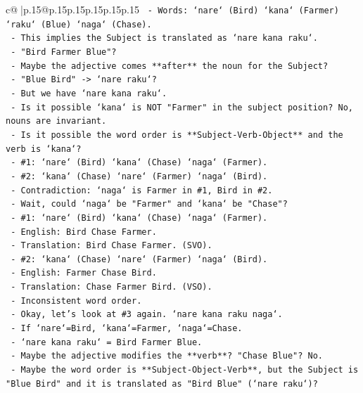 \documentclass{article}
\begin{document}
{\begin{supertabular}{c@{$\;$}|p{.15\linewidth}@{}p{.15\linewidth}p{.15\linewidth}p{.15\linewidth}p{.15\linewidth}p{.15\linewidth}}
{{{\texttt{        {-} Words: `nare` (Bird) `kana` (Farmer) `raku` (Blue) `naga` (Chase).} \\
\texttt{        {-} This implies the Subject is translated as `nare kana raku`.} \\
\texttt{        {-} "Bird Farmer Blue"?} \\
\texttt{        {-} Maybe the adjective comes **after** the noun for the Subject?} \\
\texttt{          {-} "Blue Bird" {-}> `nare raku`?} \\
\texttt{          {-} But we have `nare kana raku`.} \\
\texttt{          {-} Is it possible `kana` is NOT "Farmer" in the subject position? No, nouns are invariant.} \\
\texttt{          {-} Is it possible the word order is **Subject{-}Verb{-}Object** and the verb is `kana`?} \\
\texttt{            {-} \#1: `nare` (Bird) `kana` (Chase) `naga` (Farmer).} \\
\texttt{            {-} \#2: `kana` (Chase) `nare` (Farmer) `naga` (Bird).} \\
\texttt{              {-} Contradiction: `naga` is Farmer in \#1, Bird in \#2.} \\
\texttt{    {-} Wait, could `naga` be "Farmer" and `kana` be "Chase"?} \\
\texttt{      {-} \#1: `nare` (Bird) `kana` (Chase) `naga` (Farmer).} \\
\texttt{        {-} English: Bird Chase Farmer.} \\
\texttt{        {-} Translation: Bird Chase Farmer. (SVO).} \\
\texttt{      {-} \#2: `kana` (Chase) `nare` (Farmer) `naga` (Bird).} \\
\texttt{        {-} English: Farmer Chase Bird.} \\
\texttt{        {-} Translation: Chase Farmer Bird. (VSO).} \\
\texttt{        {-} Inconsistent word order.} \\
\texttt{    {-} Okay, let's look at \#3 again. `nare kana raku naga`.} \\
\texttt{      {-} If `nare`=Bird, `kana`=Farmer, `naga`=Chase.} \\
\texttt{      {-} `nare kana raku` = Bird Farmer Blue.} \\
\texttt{      {-} Maybe the adjective modifies the **verb**? "Chase Blue"? No.} \\
\texttt{      {-} Maybe the word order is **Subject{-}Object{-}Verb**, but the Subject is "Blue Bird" and it is translated as "Bird Blue" (`nare raku`)?} \\
}}}
\end{supertabular}}
\end{document}
